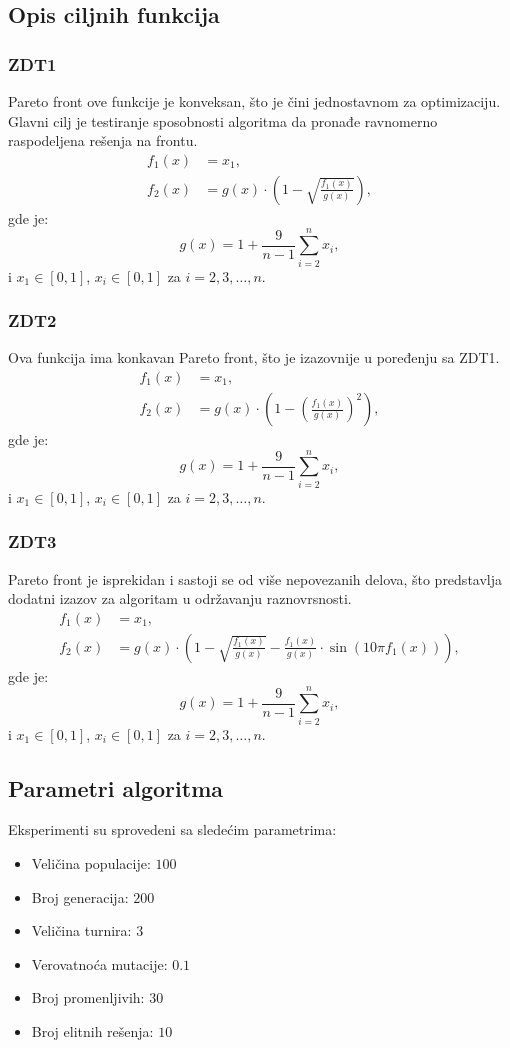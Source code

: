 \documentclass[12pt]{article}
\begin{document}
\subsection{Opis ciljnih funkcija}
\subsubsection*{ZDT1}
Pareto front ove funkcije je konveksan, što je čini jednostavnom za optimizaciju. Glavni cilj je testiranje sposobnosti algoritma da pronađe ravnomerno raspodeljena rešenja na frontu.
\[
\begin{aligned}
    f_1(x) &= x_1, \\
    f_2(x) &= g(x) \cdot \left(1 - \sqrt{\frac{f_1(x)}{g(x)}}\right),
\end{aligned}
\]
gde je:
\[
g(x) = 1 + \frac{9}{n-1} \sum_{i=2}^n x_i,
\]
i \( x_1 \in [0, 1] \), \( x_i \in [0, 1] \) za \( i = 2, 3, \dots, n \).
\[\]

\subsubsection*{ZDT2}
Ova funkcija ima konkavan Pareto front, što je izazovnije u poređenju sa ZDT1.
\[
\begin{aligned}
    f_1(x) &= x_1, \\
    f_2(x) &= g(x) \cdot \left(1 - \left(\frac{f_1(x)}{g(x)}\right)^2\right),
\end{aligned}
\]
gde je:
\[
g(x) = 1 + \frac{9}{n-1} \sum_{i=2}^n x_i,
\]
i \( x_1 \in [0, 1] \), \( x_i \in [0, 1] \) za \( i = 2, 3, \dots, n \).

\subsubsection*{ZDT3}
Pareto front je isprekidan i sastoji se od više nepovezanih delova, što predstavlja dodatni izazov za algoritam u održavanju raznovrsnosti.
\[
\begin{aligned}
    f_1(x) &= x_1, \\
    f_2(x) &= g(x) \cdot \left(1 - \sqrt{\frac{f_1(x)}{g(x)}} - \frac{f_1(x)}{g(x)} \cdot \sin(10\pi f_1(x))\right),
\end{aligned}
\]
gde je:
\[
g(x) = 1 + \frac{9}{n-1} \sum_{i=2}^n x_i,
\]
i \( x_1 \in [0, 1] \), \( x_i \in [0, 1] \) za \( i = 2, 3, \dots, n \).


\subsection{Parametri algoritma}
Eksperimenti su sprovedeni sa sledećim parametrima:
\begin{itemize}
    \item Veličina populacije: \( 100 \)
    \item Broj generacija: \( 200 \)
    \item Veličina turnira: \( 3 \)
    \item Verovatnoća mutacije: \( 0.1 \)
    \item Broj promenljivih: \( 30 \)
    \item Broj elitnih rešenja: \( 10 \)
\end{itemize}
\end{document}
